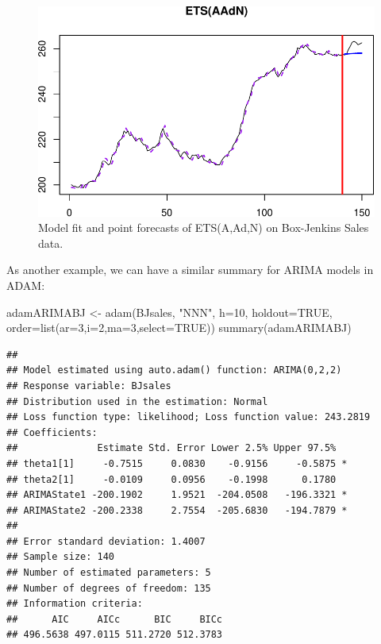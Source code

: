 \documentclass[
]{book}
\newenvironment{Shaded}{\begin{snugshade}}{\end{snugshade}}
\newcommand{\AttributeTok}[1]{\textcolor[rgb]{0.77,0.63,0.00}{#1}}
\newcommand{\ConstantTok}[1]{\textcolor[rgb]{0.00,0.00,0.00}{#1}}
\newcommand{\DecValTok}[1]{\textcolor[rgb]{0.00,0.00,0.81}{#1}}
\newcommand{\FunctionTok}[1]{\textcolor[rgb]{0.00,0.00,0.00}{#1}}
\newcommand{\NormalTok}[1]{#1}
\newcommand{\OtherTok}[1]{\textcolor[rgb]{0.56,0.35,0.01}{#1}}
\newcommand{\StringTok}[1]{\textcolor[rgb]{0.31,0.60,0.02}{#1}}
\theoremstyle{definition}
\theoremstyle{definition}
\theoremstyle{definition}
\theoremstyle{definition}
\theoremstyle{remark}
\begin{document}
\begin{figure}
\centering
\includegraphics{Svetunkov--2022----ADAM_files/figure-latex/adamModelBJAAdN-1.pdf}
\caption{\label{fig:adamModelBJAAdN}Model fit and point forecasts of ETS(A,Ad,N) on Box-Jenkins Sales data.}
\end{figure}

As another example, we can have a similar summary for ARIMA models in ADAM:

\begin{Shaded}
\begin{Highlighting}[]
\NormalTok{adamARIMABJ }\OtherTok{\textless{}{-}} \FunctionTok{adam}\NormalTok{(BJsales, }\StringTok{"NNN"}\NormalTok{, }\AttributeTok{h=}\DecValTok{10}\NormalTok{, }\AttributeTok{holdout=}\ConstantTok{TRUE}\NormalTok{,}
                    \AttributeTok{order=}\FunctionTok{list}\NormalTok{(}\AttributeTok{ar=}\DecValTok{3}\NormalTok{,}\AttributeTok{i=}\DecValTok{2}\NormalTok{,}\AttributeTok{ma=}\DecValTok{3}\NormalTok{,}\AttributeTok{select=}\ConstantTok{TRUE}\NormalTok{))}
\FunctionTok{summary}\NormalTok{(adamARIMABJ)}
\end{Highlighting}
\end{Shaded}

\begin{verbatim}
## 
## Model estimated using auto.adam() function: ARIMA(0,2,2)
## Response variable: BJsales
## Distribution used in the estimation: Normal
## Loss function type: likelihood; Loss function value: 243.2819
## Coefficients:
##              Estimate Std. Error Lower 2.5% Upper 97.5%  
## theta1[1]     -0.7515     0.0830    -0.9156     -0.5875 *
## theta2[1]     -0.0109     0.0956    -0.1998      0.1780  
## ARIMAState1 -200.1902     1.9521  -204.0508   -196.3321 *
## ARIMAState2 -200.2338     2.7554  -205.6830   -194.7879 *
## 
## Error standard deviation: 1.4007
## Sample size: 140
## Number of estimated parameters: 5
## Number of degrees of freedom: 135
## Information criteria:
##      AIC     AICc      BIC     BICc 
## 496.5638 497.0115 511.2720 512.3783
\end{verbatim}
\end{document}
